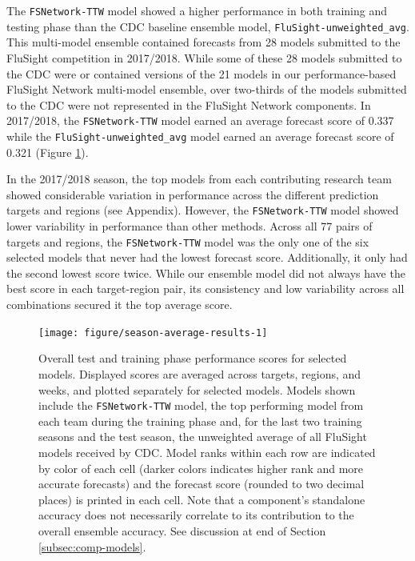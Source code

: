 \documentclass{article}\usepackage[]{graphicx}\usepackage[]{color}
\newenvironment{knitrout}{}{} %
\begin{document}
The {\tt FSNetwork-TTW} model showed a higher performance in both training and testing phase than the CDC baseline ensemble model, {\tt FluSight-unweighted\_avg}.
This multi-model ensemble contained forecasts from 28 models submitted to the FluSight competition in 2017/2018.
While some of these 28 models submitted to the CDC were or contained versions of the 21 models in our performance-based FluSight Network multi-model ensemble, over two-thirds of the models submitted to the CDC were not represented in the FluSight Network components.
In 2017/2018, the {\tt FSNetwork-TTW} model earned an average forecast score of
0.337 
while the {\tt FluSight-unweighted\_avg} model earned an average forecast score of
0.321 (Figure \ref{fig:season-average-results}).

In the 2017/2018 season, the top models from each contributing research team showed considerable variation in performance across the different prediction targets and regions (see Appendix). 
However, the {\tt FSNetwork-TTW} model showed lower variability in performance than other methods. 
Across all 77 pairs of targets and regions, the {\tt FSNetwork-TTW} model was the only one of the six selected models that never had the lowest forecast score.
Additionally, it only had the second lowest score twice. 
While our ensemble model did not always have the best score in each target-region pair, its consistency and low variability across all combinations secured it the top average score.



\begin{knitrout}
\color{fgcolor}\begin{figure}
\texttt{[image: figure/season-average-results-1]} \caption{Overall test and training phase performance scores for selected models. Displayed scores are averaged across targets, regions, and weeks, and plotted separately for selected models. Models shown include the {\tt FSNetwork-TTW} model, the top performing model from each team during the training phase and, for the last two training seasons and the test season, the unweighted average of all FluSight models received by CDC. Model ranks within each row are indicated by color of each cell (darker colors indicates higher rank and more accurate forecasts) and the forecast score (rounded to two decimal places) is printed in each cell. Note that a component's standalone accuracy does not necessarily correlate to its contribution to the overall ensemble accuracy.  See discussion at end of Section \ref{subsec:comp-models}.}\label{fig:season-average-results}
\end{figure}


\end{knitrout}
\end{document}
